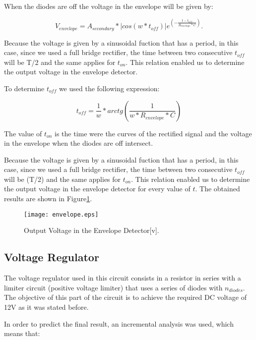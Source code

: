 When the diodes are off the voltage in the envelope will be given by:

\begin{equation}
  V_{envelope} = A_{secondary}*|cos(w*t_{off})|e^(-\frac{t-t_{off}}{R_{envelope}*C}).
  \label{eq:veoff}
\end{equation}

\par Because the voltage is given by a sinusoidal fuction that has a period, in this case, since we used a full bridge rectifier, the time between two consecutive $t_{off}$ will be T/2 and the same applies for $t_{on}$. This relation enabled us to determine the output voltage in the envelope detector.
\par To determine $t_{off}$ we used the following expression:

\begin{equation}
  t_{off} = \frac{1}{w}*arctg(\frac{1}{w*R_{envelope}*C})
  \label{eq:toff}
\end{equation}

\par The value of $t_{on}$ is the time were the curves of the rectified signal and the voltage in the envelope when the diodes are off intersect.

\par Because the voltage is given by a sinusoidal fuction that has a period, in this case, since we used a full bridge rectifier, the time between two consecutive $t_{off}$ will be (T/2) and the same applies for $t_{on}$. This relation enabled us to determine the output voltage in the envelope detector for every value of $t$. The obtained results are shown in Figure\ref{fig:venvelope}.

\begin{figure}[h] \centering
\texttt{[image: envelope.eps]}
\caption{Output Voltage in the Envelope Detector[v].}
\label{fig:venvelope}
\end{figure}

\newpage

\subsection{Voltage Regulator}

\par The voltage regulator used in this circuit consists in a resistor in series with a limiter circuit (positive voltage limiter) that uses a series of diodes with $n_{diodes}$. The objective of this part of the circuit is to achieve the required DC voltage of 12V as it was stated before.
\par In order to predict the final result, an incremental analysis was used, which means that:

